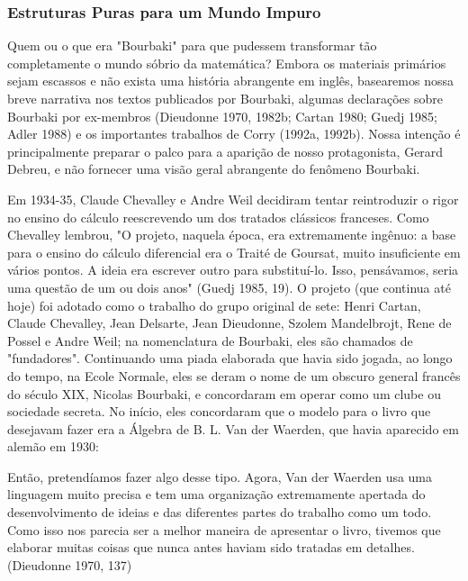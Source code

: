 \documentclass[12pt]{article}
\begin{document}
\subsubsection{\textbf{Estruturas Puras para um Mundo Impuro}}
Quem ou o que era "Bourbaki" para que pudessem transformar tão completamente o mundo sóbrio da matemática? Embora os materiais primários sejam escassos e não exista uma história abrangente em inglês, basearemos nossa breve narrativa nos textos publicados por Bourbaki, algumas declarações sobre Bourbaki por ex-membros (Dieudonne 1970, 1982b; Cartan 1980; Guedj 1985; Adler 1988) e os importantes trabalhos de Corry (1992a, 1992b). Nossa intenção é principalmente preparar o palco para a aparição de nosso protagonista, Gerard Debreu, e não fornecer uma visão geral abrangente do fenômeno Bourbaki.

Em 1934-35, Claude Chevalley e Andre Weil decidiram tentar reintroduzir o rigor no ensino do cálculo reescrevendo um dos tratados clássicos franceses. Como Chevalley lembrou, "O projeto, naquela época, era extremamente ingênuo: a base para o ensino do cálculo diferencial era o Traité de Goursat, muito insuficiente em vários pontos. A ideia era escrever outro para substituí-lo. Isso, pensávamos, seria uma questão de um ou dois anos" (Guedj 1985, 19). O projeto (que continua até hoje) foi adotado como o trabalho do grupo original de sete: Henri Cartan, Claude Chevalley, Jean Delsarte, Jean Dieudonne, Szolem Mandelbrojt, Rene de Possel e Andre Weil; na nomenclatura de Bourbaki, eles são chamados de "fundadores". Continuando uma piada elaborada que havia sido jogada, ao longo do tempo, na Ecole Normale, eles se deram o nome de um obscuro general francês do século XIX, Nicolas Bourbaki, e concordaram em operar como um clube ou sociedade secreta. No início, eles concordaram que o modelo para o livro que desejavam fazer era a Álgebra de B. L. Van der Waerden, que havia aparecido em alemão em 1930:

Então, pretendíamos fazer algo desse tipo. Agora, Van der Waerden usa uma linguagem muito precisa e tem uma organização extremamente apertada do desenvolvimento de ideias e das diferentes partes do trabalho como um todo. Como isso nos parecia ser a melhor maneira de apresentar o livro, tivemos que elaborar muitas coisas que nunca antes haviam sido tratadas em detalhes. (Dieudonne 1970, 137)
\end{document}
